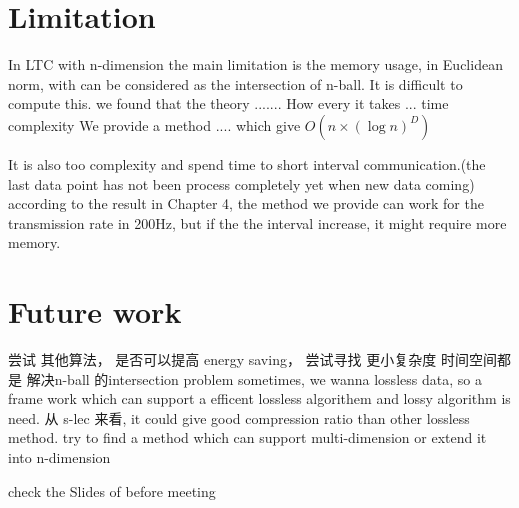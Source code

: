 





\section{Limitation}

In LTC with n-dimension the main limitation is the memory usage, in Euclidean norm, with can be considered as the intersection of n-ball.
It is difficult to compute this. we found that the theory .......
How every it takes ... time complexity
We provide a method .... which give $O(n\times (\log{n})^D)$

It is also too complexity and spend time to short interval communication.(the last data point has not been process completely yet when new data coming)
according to the result in Chapter 4, the method we provide can work for the transmission rate in 200Hz, but if the the interval increase, it might require more memory.


\section{Future work}

尝试 其他算法， 是否可以提高 energy saving， 尝试寻找 更小复杂度 时间空间都是 解决n-ball 的intersection problem
sometimes, we wanna lossless data, so a frame work which can support a efficent lossless algorithem and lossy algorithm is need. 
从 s-lec 来看, it could give good compression ratio than other lossless method.
try to find a method which can support multi-dimension or extend it into n-dimension

check the Slides of before meeting 

